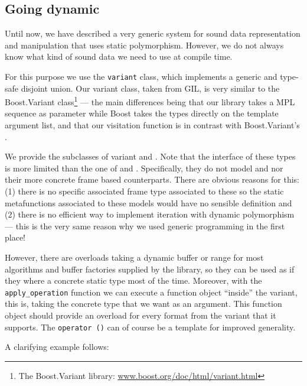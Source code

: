 \subsection{Going dynamic}
\label{sec:ns-sound-end}

Until now, we have described a very
generic system for sound data representation and manipulation that
uses static polymorphism. However, we do not always know what kind of
sound data we need to use at compile time.

For this purpose we use the
\texttt{variant} class, which implements a generic and type-safe
disjoint union. Our variant class, taken from GIL, is very similar to
the Boost.Variant class\footnote{The Boost.Variant library:
  \url{www.boost.org/doc/html/variant.html}} --- the main differences
being that our library takes a MPL sequence as parameter while Boost
takes the types directly on the template argument list, and that our
visitation function is  in contrast with
Boost.Variant's .

We provide the subclasses of variant  and
. Note that the interface of these types
is more limited than the one of  and
. Specifically, they do not model
 and  nor
their more concrete frame based counterparts. There
are obvious reasons for this: (1) there is no specific associated
frame type associated to these so the static metafunctions associated
to these models would have no sensible definition and (2) there is no
efficient way to implement iteration with dynamic polymorphism ---
this is the very same reason why we used generic programming in the
first place!

However, there are overloads taking a dynamic buffer or range for most
algorithms and buffer factories supplied by the library, so they can
be used as if they where a concrete static type most of the
time. Moreover, with the \texttt{apply\_operation} function we can
execute a function object ``inside'' the variant, this is, taking the
concrete type that we want as an argument. This function object should
provide an  overload for every format from the
variant that it supports. The \texttt{operator ()} can of course be a
template for improved generality.

A clarifying example follows:

